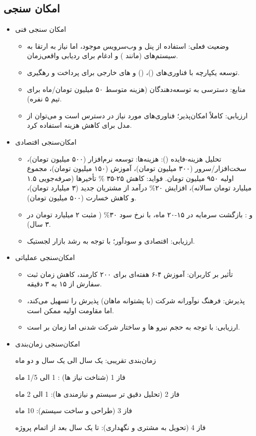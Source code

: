 \documentclass[12pt,a4paper]{report}
\begin{document}
\subsection{امکان سنجی}
\begin{itemize}
	\item امکان سنجی فنی
\begin{itemize}
	\item 
وضعیت فعلی: استفاده از پنل و وب‌سرویس موجود، اما نیاز به ارتقا به سیستم‌های  (مانند ) و ادغام برای ردیابی واقعی‌زمان.
	\item 
توسعه  یکپارچه با فناوری‌های  ()،  () و های خارجی برای پرداخت و رهگیری.
	\item 
منابع: دسترسی به توسعه‌دهندگان (هزینه متوسط ۵۰ میلیون تومان/ماه برای تیم ۵ نفره).
	\item 
ارزیابی: کاملاً امکان‌پذیر؛ فناوری‌های مورد نیاز در دسترس است و می‌توان از مدل  برای کاهش هزینه استفاده کرد.
\end{itemize}
	\item امکان‌سنجی اقتصادی 
	\begin{itemize}
		\item تحلیل هزینه-فایده (): هزینه‌ها: توسعه نرم‌افزار (۵۰۰ میلیون تومان)، سخت‌افزار/سرور (۳۰۰ میلیون تومان)، آموزش (۱۵۰ میلیون تومان)، مجموع اولیه ۹۵۰ میلیون تومان. فواید: کاهش ۲۵-۳۵ \% تأخیرها (صرفه‌جویی ۱.۵ میلیارد تومان سالانه)، افزایش ۲۰\% درآمد از مشتریان جدید (۳ میلیارد تومان)، و کاهش خسارت (۵۰۰ میلیون تومان).
		\item 
	 و : بازگشت سرمایه در ۱۵-۲۰ ماه، با نرخ سود ۳۰\% ( مثبت ۲ میلیارد تومان در ۳ سال).
		\item ارزیابی: اقتصادی و سودآور؛ با توجه به رشد بازار لجستیک.
	\end{itemize}
	\item امکان‌سنجی عملیاتی
	\begin{itemize}
		\item تأثیر بر کاربران: آموزش ۴-۶ هفته‌ای برای ۲۰۰ کارمند، کاهش زمان ثبت سفارش از ۱۵ به ۳ دقیقه.
		\item پذیرش: فرهنگ نوآورانه شرکت (با پشتوانه ماهان) پذیرش را تسهیل می‌کند، اما مقاومت اولیه ممکن است.
		\item ارزیابی: با توجه به حجم نیرو ها و ساختار شرکت شدنی اما زمان بر است.
	\end{itemize}
	\item امکان‌سنجی زمان‌بندی		

زمان‌بندی تقریبی: یک سال الی یک سال و دو ماه

فاز 1 (شناخت نیاز ها) : 1 الی 1/5 ماه

فاز 2 (تحلیل دقیق تر سیستم و نیازمندی ها): 1 الی 2 ماه

فاز 3 (طراحی و ساخت سیستم):  10 ماه

فاز 4 (تحویل به مشتری و نگهداری): تا یک سال بعد از اتمام پروژه

\end{itemize}
\newpage
\end{document}
